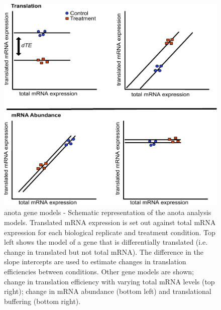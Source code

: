 \documentclass[12pt,openany]{book}
\begin{document}
\begin{figure}
  \includegraphics{./figures/geneModes_anota_Larsson.pdf}
  \caption{anota gene models - Schematic representation of the anota analysis models. Translated mRNA expression is set out against total mRNA expression for each biological replicate and treatment condition. Top left shows the model of a gene that is differentially translated (i.e. change in translated but not total mRNA). The difference in the slope intercepts are used to estimate changes in translation efficiencies between conditions. Other gene models are shown; change in translation efficiency with varying total mRNA levels (top right); change in mRNA abundance (bottom left) and translational buffering (bottom right).
  \label{fig:anota}}
\end{figure}
\end{document}
